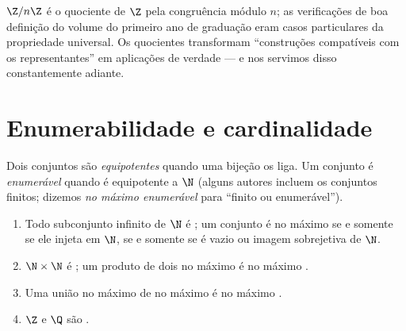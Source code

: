 \begin{example}
$\Z/n\Z$ é o quociente de $\Z$ pela congruência módulo $n$; as
verificações de boa definição do volume do primeiro ano de graduação
eram casos particulares da propriedade universal. Os quocientes
transformam ``construções compatíveis com os representantes'' em
aplicações de verdade --- e nos servimos disso constantemente adiante.
\end{example}

\section{Enumerabilidade e cardinalidade}

\begin{definition}\label{def:b2:structures:countable}
Dois conjuntos são \emph{equipotentes} quando uma
bijeção os liga. Um conjunto é \emph{enumerável} quando é
equipotente a $\N$ (alguns autores incluem os conjuntos finitos; dizemos
\emph{no máximo enumerável} para ``finito ou enumerável'').
\end{definition}

\begin{proposition}\label{prop:b2:structures:countablestable}
\begin{enumerate}
  \item Todo subconjunto infinito de $\N$ é ; um conjunto é no máximo
         se e somente se ele injeta em $\N$, se e somente se é vazio ou
        imagem sobrejetiva de $\N$.
  \item $\N \times \N$ é ; um produto de dois
         no máximo  é no máximo .
  \item Uma união no máximo  de  no máximo  é no
        máximo .
  \item $\Z$ e $\Q$ são .
\end{enumerate}
\end{proposition}

